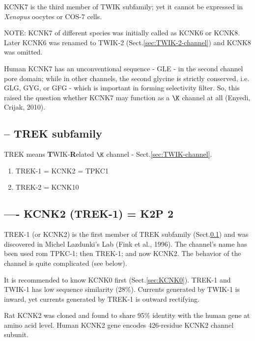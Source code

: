 KCNK7 is the third member of TWIK subfamily; yet it cannot be expressed in {\it
Xenopus} oocytes or COS-7 cells. 

NOTE: KCNK7 of different species was initially called as KCNK6 or KCNK8. Later
KCNK6 was renamed to TWIK-2 (Sect.\ref{sec:TWIK-2-channel}) and KCNK8 was
omitted.

Human KCNK7 has an unconventional sequence - GLE - in the second channel pore
domain; while in other channels, the second glycine is strictly conserved, i.e.
GLG, GYG, or GFG - which is important in forming selectivity filter. So, this
raised the question whether KCNK7 may function as a $\K$ channel at all
(Enyedi, Crijak, 2010).

\subsection{-- TREK subfamily}
\label{sec:TREK-channel}
  
TREK means {\bf T}WIK-{\bf R}elated $\K$ channel -
Sect.\ref{sec:TWIK-channel}.
\begin{enumerate}
  \item TREK-1 = KCNK2 = TPKC1
  
  \item TREK-2 = KCNK10
\end{enumerate}

\subsection{---- KCNK2 (TREK-1) = K2P 2}
\label{sec:KCNK2}
\label{sec:TREK-1-channel}

TREK-1 (or KCNK2) is the first member of TREK subfamily
(Sect.\ref{sec:TREK-channel}) and was discovered in Michel Lazdunki's Lab (Fink
et al., 1996). The channel's name has been used rom TPKC-1; then TREK-1; and now
KCNK2. The behavior of the channel is quite complicated (see below).

It is recommended to know KCNK0 first (Sect.\ref{sec:KCNK0}).
TREK-1 and TWIK-1 has low sequence similarity (28\%). Currents generated by
TWIK-1 is inward, yet currents generated by TREK-1 is outward rectifying.

Rat KCNK2 was cloned and found to share 95\% identity with the human gene at
amino acid level. Human KCNK2 gene encodes 426-residue KCNK2 channel subunit.

